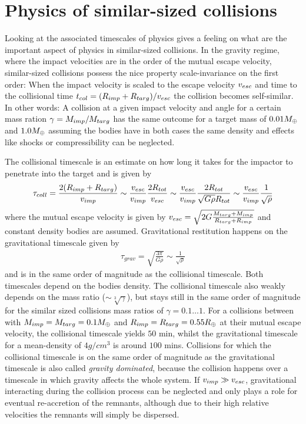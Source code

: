 \section{Physics of similar-sized collisions}
Looking at the associated timescales of physics gives a feeling on what are the important aspect of physics in similar-sized collisions. In the gravity regime, where the impact velocities are in the order of the mutual escape velocity, similar-sized collisions possess the nice property scale-invariance on the first order: When the impact velocity is scaled to the escape velocity $v_{esc}$ and time to the collisional time $t_{col} = ( R_{imp} + R_{targ} ) / v_{esc}$ the collision becomes self-similar. In other words: A collision at a given impact velocity and angle for a certain mass ration $\gamma = M_{imp} / M_{targ}$ has the same outcome for a target mass of $0.01 M_{\oplus}$ and $1.0 M_{\oplus}$ assuming the bodies have in both cases the same density and effects like shocks or compressibility can be neglected.

The collisional timescale is an estimate on how long it takes for the impactor to penetrate into the target and is given by
\begin{align}
\tau_{coll} = \frac{2 (R_{imp} + R_{targ})}{v_{imp}} \sim \frac{v_{esc}}{v_{imp}} \frac{2 R_{tot}}{v_{esc}} \sim \frac{v_{esc}}{v_{imp}}  \frac{2 R_{tot}}{\sqrt{G \rho} R_{tot}} \sim \frac{v_{esc}}{v_{imp}} \frac{1}{\sqrt{\rho}}
\end{align}
where the mutual escape velocity is given by $v_{esc} = \sqrt{ 2 G \frac{M_{targ} + M_{imp}}{R_{targ} + R_{imp}} }$ and constant density bodies are assumed. Gravitational restitution happens on the gravitational timescale given by
\begin{align}
\tau_{grav} = \sqrt{\frac{3 \pi }{G \rho} } \sim \frac{1}{\sqrt{\rho}}
\end{align}
and is in the same order of magnitude as the collisional timescale. Both timescales depend on the bodies density. The collisional timescale also weakly depends on the mass ratio ($\sim \sqrt[3]{\gamma}$), but stays still in the same order of magnitude for the similar sized collisions mass ratios of $\gamma = 0.1 \dots 1$. For a collisions between with $M_{imp} = M_{targ} = 0.1M_{\oplus}$ and $R_{imp} = R_{targ} = 0.55 R_{\oplus}$ at their mutual escape velocity, the collisional timescale yields $50$ min, whilst the gravitational timescale for a mean-density of $4g/cm^3$ is around $100$ mins. Collisions for which the collisional timescale is on the same order of magnitude as the gravitational timescale is also called \emph{gravity dominated}, because the collision happens over a timescale in which gravity affects the whole system. If $v_{imp} \gg v_{esc}$, gravitational interacting during the collision process can be neglected and only plays a role for eventual re-accretion  of the remnants, although due to their high relative velocities the remnants will simply be dispersed.

